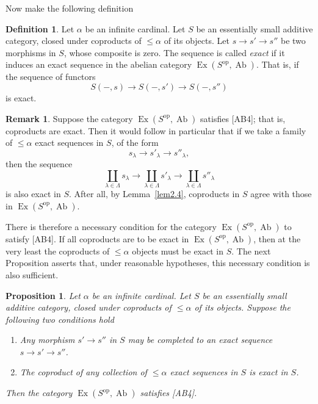 \documentclass[11pt,a4paper]{article}
\theoremstyle{plain}
\newtheorem{proposition}[theorem]{Proposition}
\theoremstyle{definition}
\newtheorem{definition}[theorem]{Definition}
\newtheorem{remark}[theorem]{Remark}
\DeclareMathOperator{\Ex}{Ex}
\DeclareMathOperator{\Ab}{Ab}
\newcommand{\op}{\mathrm{op}}
\numberwithin{equation}{section}
\begin{document}
Now make the following definition

\begin{definition}\label{def2.7}
Let $\alpha$ be an infinite cardinal. Let $S$ be an essentially small additive category, closed under coproducts of $\leq\alpha$ of its objects. Let $s \to s' \to s''$ be two morphisms in $S$, whose composite is zero. The sequence is called \emph{exact} if it induces an exact sequence in the abelian category $\Ex(S^{\op},\Ab)$. That is, if the sequence of functors
\begin{equation*}
S(-,s) \longrightarrow S(-,s') \longrightarrow S(-,s'')
\end{equation*}
is exact.
\end{definition}

\begin{remark}\label{rem2.8}
Suppose the category $\Ex(S^{\op},\Ab)$ satisfies [AB4]; that is, coproducts are exact. Then it would follow in particular that if we take a family of $\leq\alpha$ exact sequences in $S$, of the form
\begin{equation*}
s_{\lambda} \longrightarrow s'_{\lambda} \longrightarrow s''_{\lambda},
\end{equation*}
then the sequence
\begin{equation*}
\coprod_{\lambda\in\Lambda} s_{\lambda} \longrightarrow \coprod_{\lambda\in\Lambda} s'_{\lambda} \longrightarrow \coprod_{\lambda\in\Lambda} s''_{\lambda}
\end{equation*}
is also exact in $S$. After all, by Lemma~\ref{lem2.4}, coproducts in $S$ agree with those in $\Ex(S^{\op},\Ab)$.

There is therefore a necessary condition for the category $\Ex(S^{\op},\Ab)$ to satisfy [AB4]. If all coproducts are to be exact in $\Ex(S^{\op},\Ab)$, then at the very least the coproducts of $\leq\alpha$ objects must be exact in $S$. The next Proposition asserts that, under reasonable hypotheses, this necessary condition is also sufficient.
\end{remark}

\begin{proposition}\label{prop2.9}
Let $\alpha$ be an infinite cardinal. Let $S$ be an essentially small additive category, closed under coproducts of $\leq\alpha$ of its objects. Suppose the following two conditions hold
\begin{enumerate}[label=2.9.\arabic*]
\item Any morphism $s' \to s''$ in $S$ may be completed to an exact sequence $s \to s' \to s''$.
\item The coproduct of any collection of $\leq\alpha$ exact sequences in $S$ is exact in $S$.
\end{enumerate}
Then the category $\Ex(S^{\op},\Ab)$ satisfies [AB4].
\end{proposition}
\end{document}

